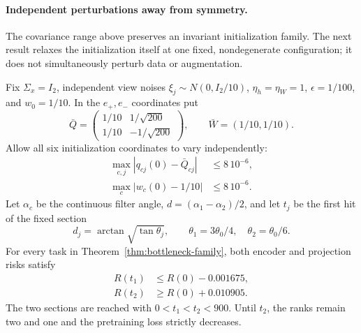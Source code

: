 \paragraph{Independent perturbations away from symmetry.}
The covariance range above preserves an invariant initialization family. The next result relaxes the initialization itself at one fixed, nondegenerate configuration; it does not simultaneously perturb data or augmentation.

\begin{theorem}
\label{thm:asymmetric-rebound}
Fix $\Sigma_x=I_2$, independent view noises $\xi_j\sim N(0,I_2/10)$, $\eta_h=\eta_W=1$, $\epsilon=1/100$, and $w_0=1/10$. In the $e_+,e_-$ coordinates put
\begin{equation}
 \bar Q=\begin{pmatrix}1/10&1/\sqrt{200}\\1/10&-1/\sqrt{200}\end{pmatrix},
 \qquad \bar W=(1/10,1/10).
\end{equation}
Allow all six initialization coordinates to vary independently:
\begin{align}
 \max_{c,j}|q_{cj}(0)-\bar Q_{cj}|&\le8\,10^{-6},\nonumber\\
 \max_c|w_c(0)-1/10|&\le8\,10^{-6}.
 \label{eq:asymmetric-cube}
\end{align}
Let $\alpha_c$ be the continuous filter angle, $d=(\alpha_1-\alpha_2)/2$, and let $t_j$ be the first hit of the fixed section
\begin{equation}
 d_j=\arctan\sqrt{\tan\theta_j},\qquad
 \theta_1=3\theta_0/4,\quad \theta_2=\theta_0/6.
\end{equation}
For every task in Theorem~\ref{thm:bottleneck-family}, both encoder and projection risks satisfy
\begin{align}
 R(t_1)&\le R(0)-0.001675,\\
 R(t_2)&\ge R(0)+0.010905.
\end{align}
The two sections are reached with $0<t_1<t_2<900$. Until $t_2$, the ranks remain two and one and the pretraining loss strictly decreases.
\end{theorem}

